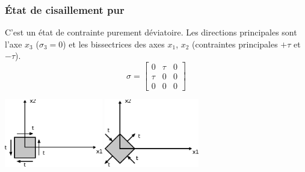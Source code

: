 \subsubsection{État de cisaillement pur}
C'est un état de contrainte purement déviatoire.
Les directions principales sont l'axe $x_3$ ($\sigma_3= 0$) et les bissectrices des axes $x_1$, $x_2$ (contraintes principales $+\tau$ et $-\tau$). 
\begin{equation}
    \mathbb{\sigma} = 
    \begin{bmatrix}
        0 & \tau & 0 \\
        \tau & 0 & 0 \\
        0 & 0 & 0
    \end{bmatrix}
    \label{eq:Ch02-021}
\end{equation}
    \begin{center}
        \includegraphics[height=3cm]{../images/T1_Ch02-0009a}\hspace*{2cm}
        \includegraphics[height=3cm]{../images/T1_Ch02-0009b}
    \end{center}
